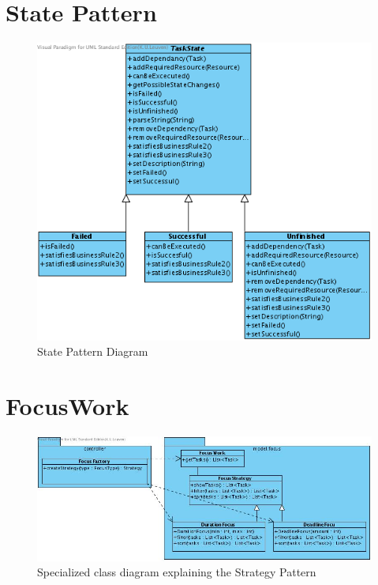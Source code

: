 	\newpage
	\appendix
	\section{State Pattern}
	\begin{figure}[H]
		\begin{center}
			\includegraphics[scale=0.6]{images/State_Pattern.png}
		\end{center}
		\caption{State Pattern Diagram}
	\end{figure}
	\section{FocusWork}
	\begin{figure}[H]
		\begin{center}
			\includegraphics[scale=0.5]{images/focus_class_diagram.jpg}
		\end{center}
		\caption{Specialized class diagram explaining the Strategy Pattern}
	\end{figure}
